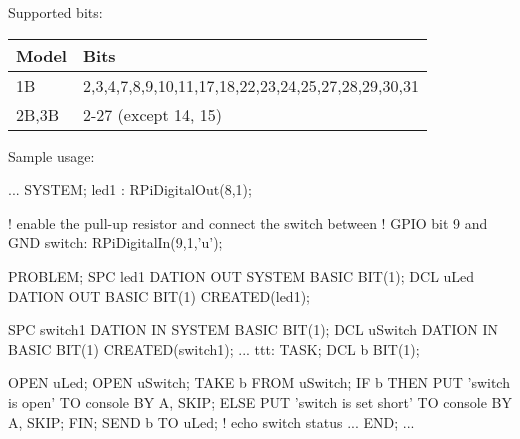 Supported bits:

\begin{tabular}{|l|l|}
\hline
Model & Bits \\
\hline
1B & 2,3,4,7,8,9,10,11,17,18,22,23,24,25,27,28,29,30,31 \\
\hline
2B,3B & 2-27 (except 14, 15) \\
\hline
\end{tabular}  

Sample usage:
\begin{PEARLCode}
...
SYSTEM;
  led1 : RPiDigitalOut(8,1);

  ! enable the pull-up resistor and connect the switch between 
  ! GPIO bit 9 and GND
  switch: RPiDigitalIn(9,1,'u');

PROBLEM;
   SPC led1 DATION OUT SYSTEM BASIC BIT(1);
   DCL uLed DATION OUT BASIC BIT(1) CREATED(led1);

   SPC switch1 DATION IN SYSTEM BASIC BIT(1);
   DCL uSwitch DATION IN BASIC BIT(1) CREATED(switch1);
...
ttt: TASK;
   DCL b BIT(1);

   OPEN uLed;
   OPEN uSwitch;
   TAKE b FROM uSwitch;
   IF b THEN
      PUT 'switch is open' TO console BY A, SKIP;
   ELSE
      PUT 'switch is set short' TO console BY A, SKIP;
   FIN;
   SEND b TO uLed;  ! echo switch status
...
END;
...
\end{PEARLCode}

